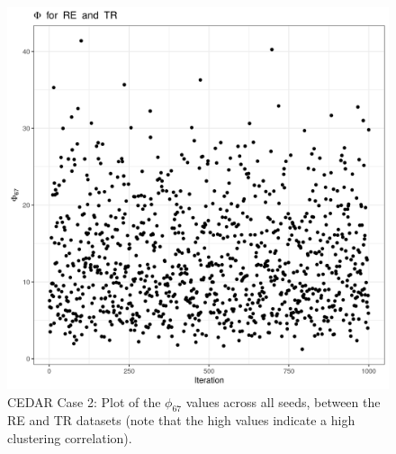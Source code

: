 \documentclass[14pt]{extarticle} %
\begin{document}
	\begin{figure}[h]
		\centering
		\includegraphics[scale=0.75]{Images/Biology_data/Set_1000/All_datasets/Phi_series_plots/file_1_Phi_67.png}
		\caption{CEDAR Case 2: Plot of the $\phi_{67}$ values across all seeds, between the RE and TR datasets (note that the high values indicate a high clustering correlation).}
		\label{fig:results:cedar_2:mdi_re_tr_phi_series_plot}
	\end{figure}
	
	
\end{document}
